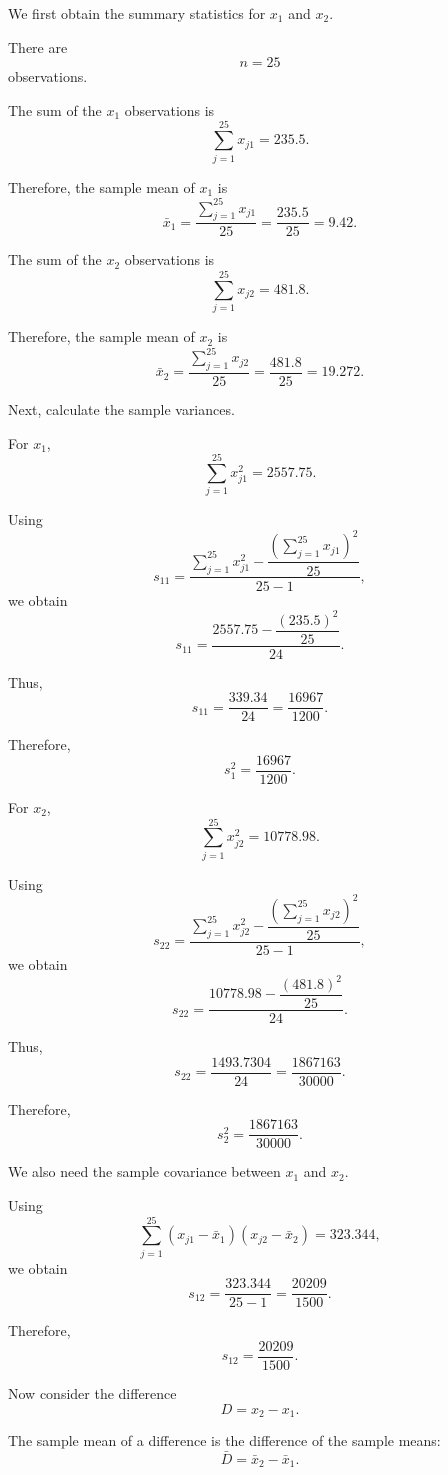 \documentclass[12pt]{article}
\begin{document}
	We first obtain the summary statistics for \(x_1\) and
	\(x_2\).
	
	There are
	\[
	n=25
	\]
	observations.
	
	The sum of the \(x_1\) observations is
	\[
	\sum_{j=1}^{25}x_{j1}
	=
	235.5.
	\]
	
	Therefore, the sample mean of \(x_1\) is
	\[
	\bar{x}_1
	=
	\frac{\sum_{j=1}^{25}x_{j1}}{25}
	=
	\frac{235.5}{25}
	=
	\boxed{9.42}.
	\]
	
	The sum of the \(x_2\) observations is
	\[
	\sum_{j=1}^{25}x_{j2}
	=
	481.8.
	\]
	
	Therefore, the sample mean of \(x_2\) is
	\[
	\bar{x}_2
	=
	\frac{\sum_{j=1}^{25}x_{j2}}{25}
	=
	\frac{481.8}{25}
	=
	\boxed{19.272}.
	\]
	
	Next, calculate the sample variances.
	
	For \(x_1\),
	\[
	\sum_{j=1}^{25}x_{j1}^2
	=
	2557.75.
	\]
	
	Using
	\[
	s_{11}
	=
	\frac{
		\sum_{j=1}^{25}x_{j1}^2
		-
		\dfrac{\left(\sum_{j=1}^{25}x_{j1}\right)^2}{25}
	}{25-1},
	\]
	we obtain
	\[
	s_{11}
	=
	\frac{
		2557.75-\dfrac{(235.5)^2}{25}
	}{24}.
	\]
	
	Thus,
	\[
	s_{11}
	=
	\frac{339.34}{24}
	=
	\boxed{\frac{16967}{1200}}.
	\]
	
	Therefore,
	\[
	\boxed{s_1^2=\frac{16967}{1200}}.
	\]
	
	For \(x_2\),
	\[
	\sum_{j=1}^{25}x_{j2}^2
	=
	10778.98.
	\]
	
	Using
	\[
	s_{22}
	=
	\frac{
		\sum_{j=1}^{25}x_{j2}^2
		-
		\dfrac{\left(\sum_{j=1}^{25}x_{j2}\right)^2}{25}
	}{25-1},
	\]
	we obtain
	\[
	s_{22}
	=
	\frac{
		10778.98-\dfrac{(481.8)^2}{25}
	}{24}.
	\]
	
	Thus,
	\[
	s_{22}
	=
	\frac{1493.7304}{24}
	=
	\boxed{\frac{1867163}{30000}}.
	\]
	
	Therefore,
	\[
	\boxed{s_2^2=\frac{1867163}{30000}}.
	\]
	
	We also need the sample covariance between \(x_1\) and
	\(x_2\).
	
	Using
	\[
	\sum_{j=1}^{25}
	(x_{j1}-\bar{x}_1)(x_{j2}-\bar{x}_2)
	=
	323.344,
	\]
	we obtain
	\[
	s_{12}
	=
	\frac{323.344}{25-1}
	=
	\boxed{\frac{20209}{1500}}.
	\]
	
	Therefore,
	\[
	\boxed{s_{12}=\frac{20209}{1500}}.
	\]
	
	Now consider the difference
	\[
	D=x_2-x_1.
	\]
	
	The sample mean of a difference is the difference of the
	sample means:
	\[
	\bar{D}
	=
	\bar{x}_2-\bar{x}_1.
	\]
	
\end{document}
